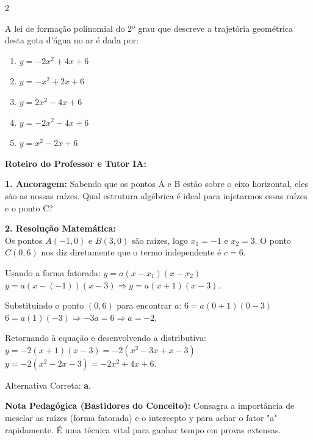 \begin{multicols*}{2}
\begin{enunciadoLiteral}
A lei de formação polinomial do 2º grau que descreve a trajetória geométrica desta gota d'água no ar é dada por:

\begin{enumerate}[label=\alph*), itemsep=\espacoAlt]
    \item $y = -2x^2 + 4x + 6$
    \item $y = -x^2 + 2x + 6$
    \item $y = 2x^2 - 4x + 6$
    \item $y = -2x^2 - 4x + 6$
    \item $y = x^2 - 2x + 6$
\end{enumerate}
\end{enunciadoLiteral}

\ifgabarito
    \begin{tcolorbox}[colback=CorTitUm!5, colframe=CorTitUm, boxrule=1pt, arc=4pt, left=6pt, right=6pt, top=6pt, bottom=6pt]
    \small\textbf{\textcolor{CorTitUm}{Roteiro do Professor e Tutor IA:}}\par\vspace{0.1cm}
    \color{CinzaEscuro}
    \textbf{1. Ancoragem:} Sabendo que os pontos A e B estão sobre o eixo horizontal, eles são as nossas raízes. Qual estrutura algébrica é ideal para injetarmos essas raízes e o ponto C?\par\vspace{0.1cm}
    \textbf{2. Resolução Matemática:}\\
    Os pontos $A(-1, 0)$ e $B(3, 0)$ são raízes, logo $x_1 = -1$ e $x_2 = 3$.
    O ponto $C(0, 6)$ nos diz diretamente que o termo independente é $c = 6$.
    
    Usando a forma fatorada: $y = a(x - x_1)(x - x_2)$
    $y = a(x - (-1))(x - 3) \Rightarrow y = a(x + 1)(x - 3)$.
    
    Substituindo o ponto $(0, 6)$ para encontrar $a$:
    $6 = a(0 + 1)(0 - 3)$
    $6 = a(1)(-3) \Rightarrow -3a = 6 \Rightarrow a = -2$.
    
    Retornando à equação e desenvolvendo a distributiva:
    $y = -2(x + 1)(x - 3) = -2(x^2 - 3x + x - 3)$
    $y = -2(x^2 - 2x - 3) = -2x^2 + 4x + 6$.
    
    Alternativa Correta: \textbf{a}.
    \end{tcolorbox}
    \vspace{0.15cm}
    
    \begin{boxexplicacao}
    \textbf{Nota Pedagógica (Bastidores do Conceito):} Consagra a importância de mesclar as raízes (forma fatorada) e o intercepto y para achar o fator "a" rapidamente. É uma técnica vital para ganhar tempo em provas extensas.
    \end{boxexplicacao}
\fi


\end{multicols*}

